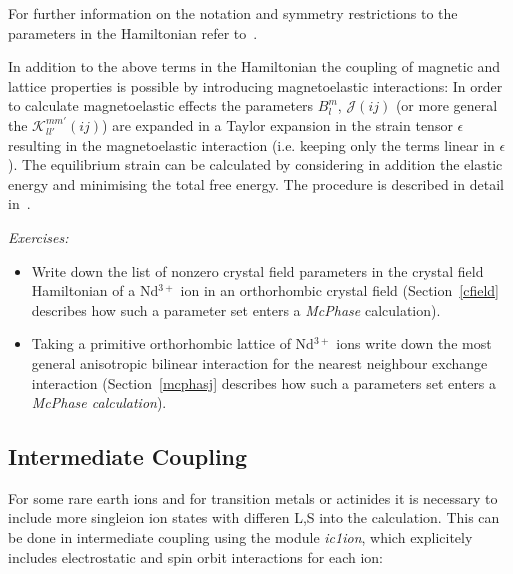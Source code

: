 \documentclass[twoside]{article}
\newcommand{\prg}{\sl}
\begin{document}
For further information on the notation and symmetry restrictions to the
parameters in the Hamiltonian refer to~\cite{jensen91-1}.

In addition to the above terms in the Hamiltonian the coupling of magnetic and lattice properties
is possible by introducing magnetoelastic interactions:
In order to calculate magnetoelastic effects the parameters $B_l^m$, ${\mathcal J}(ij)$ (or more general
the ${\mathcal K}_{ll'}^{mm'}(ij)$) are expanded in a Taylor expansion in the strain tensor
$\epsilon$ resulting in the magnetoelastic interaction (i.e. keeping only the terms linear
in $\epsilon$). The equilibrium strain can be 
calculated by considering in addition the elastic energy and minimising the total free energy.
The procedure is described in detail in~\cite{rotter02-8885}.


 


\vspace{1cm}

{\em Exercises:}
\begin{itemize}
\item Write down the list of nonzero crystal field parameters in the crystal field Hamiltonian
of a Nd$^{3+}$ ion in an orthorhombic crystal field (Section~\ref{cfield} describes how such a parameter set
enters a {\prg McPhase} calculation).
\item Taking a primitive orthorhombic lattice of Nd$^{3+}$ ions write down the most general
anisotropic bilinear interaction  for the nearest neighbour exchange interaction
(Section~\ref{mcphasj} describes how such a parameters set enters a {\prg McPhase calculation}).
\end{itemize}


\subsection{Intermediate Coupling}

For some rare earth ions and for transition metals or actinides it is necessary to
include more singleion ion states with differen L,S into the calculation. This
can be done in intermediate coupling using the module {\prg ic1ion}, which
explicitely includes electrostatic and  spin orbit interactions for each ion:
\end{document}

